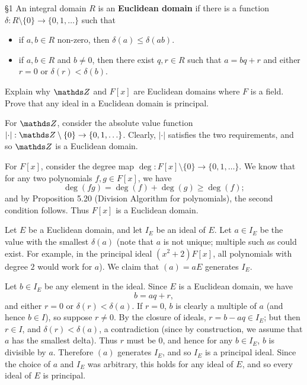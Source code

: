 \documentclass{homework}
\begin{document}
\begin{problem}{\S 1}
  An integral domain $R$ is an \textbf{Euclidean domain} if there is a function $\delta: R\setminus
  \{ 0 \}\to \{ 0,1,\ldots \}$ such that
  \begin{itemize}
    \item if $a,b\in R$ non-zero, then $\delta(a)\le \delta(ab)$.
    \item if $a,b\in R$ and $b\neq 0$, then there exist $q,r\in R$ such that $a=bq+r$ and either
      $r=0$ or $\delta(r)<\delta(b)$.
  \end{itemize}
  Explain why $\Z$ and $F[x]$ are Euclidean domains where $F$ is a field. Prove that any ideal in a
  Euclidean domain is principal.
\end{problem}

\begin{solution}
  For $\Z$, consider the absolute value function $\left| \cdot  \right| : \Z\setminus \{ 0 \}\to \{
  0,1,\ldots\}$. Clearly, $\left| \cdot  \right| $ satisfies the two requirements, and so $\Z$ is a
  Euclidean domain.

  For $F[x]$, consider the degree map $\deg: F[x]\setminus \{ 0 \} \to \{ 0,1,\ldots \}$. We know
  that for any two polynomials $f,g\in F[x]$, we have \[
    \deg{(fg)}=\deg{(f)}+\deg{(g)}\ge \deg{(f)}
  ;\] and by Proposition 5.20 (Division Algorithm for polynomials), the second condition follows.
  Thus $F[x]$ is a Euclidean domain.

  Let $E$ be a Euclidean domain, and let $I_E$ be an ideal of $E$. Let $a\in I_E$ be the value with
  the smallest $\delta(a)$ (note that $a$ is not unique; multiple such $a$s could exist. For
  example, in the principal ideal $(x^2+2)F[x]$, all polynomials with degree $2$ would work for
  $a$). We claim that $(a)=aE$ generates $I_E$.

  Let $b\in I_E$ be any element in the ideal. Since $E$ is a Euclidean domain, we have \[
    b = aq+r
  ,\] and either $r=0$ or $\delta(r)<\delta(a)$. If $r=0$, $b$ is clearly a multiple of $a$ (and
  hence $b\in I$), so suppose $r\neq 0$. By the closure of ideals, $r=b-aq\in I_E$; but then
  $r\in I$, and $\delta(r)<\delta(a)$, a contradiction (since by construction, we assume that $a$
  has the smallest delta). Thus $r$ must be $0$, and hence for any $b\in I_E$, $b$ is divisible by
  $a$. Therefore $(a)$ generates $I_E$, and so $I_E$ is a principal ideal. Since the choice of $a$
  and $I_E$ was arbitrary, this holds for any ideal of $E$, and so every ideal of $E$ is principal.
\end{solution}
\end{document}

